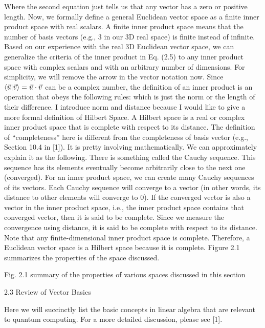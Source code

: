 \documentclass{article}
\begin{document}
Where the second equation just tells us that any vector has a zero or positive length.
Now, we formally define a general Euclidean vector space as a finite inner product space with real scalars. A finite inner product space means that the number of basis vectors (e.g., 3 in our 3D real space) is finite instead of infinite.
Based on our experience with the real 3D Euclidean vector space, we can generalize the criteria of the 
inner product in Eq. (2.5) to any inner product space with complex scalars and with an arbitrary number of dimensions. 
For simplicity, we will remove the arrow in the vector notation now. Since $\braket{\vec{u}|\vec{v}}=\vec{u}\cdot\vec{v}$
can be a complex number, the definition of an inner product is an operation that obeys the following rules:
which is just the norm or the length of their difference.
I introduce norm and distance because I would like to give a more formal definition of Hilbert Space. A Hilbert space is a real or complex inner product space that is complete with respect to its distance. The definition of “completeness” here is different from the completeness of basis vector (e.g., Section 10.4 in [1]). It is pretty involving mathematically. We can approximately explain it as the following. There is something called the Cauchy sequence. This sequence has its elements eventually become arbitrarily close to the next one (converged). For an inner product space, we can create many Cauchy sequences of its vectors. Each Cauchy sequence will converge to a vector (in other words, its distance to other elements will converge to 0). If the converged vector is also a vector in the inner product space, i.e., the inner product space contains that converged vector, then it is said to be complete. Since we measure the convergence using distance, it is said to be complete with respect to its distance.
Note that any finite-dimensional inner product space is complete. Therefore, a Euclidean vector space is a Hilbert space because it is complete.
Figure 2.1 summarizes the properties of the space discussed.








Fig. 2.1 summary of the properties of various spaces discussed in this section

2.3 Review of Vector Basics

Here we will succinctly list the basic concepts in linear algebra that are relevant to quantum computing. For a more detailed discussion, please see [1].
\end{document}
